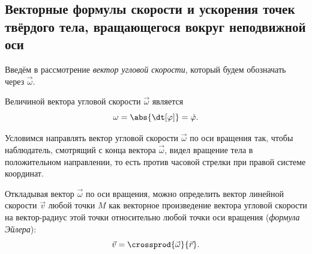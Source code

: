 
\subsection{Векторные формулы скорости и ускорения точек твёрдого тела,
вращающегося вокруг неподвижной оси}

Введём в рассмотрение \textit{вектор угловой скорости}, который будем обозначать
через $\vec{\omega}$.

Величиной вектора угловой скорости $\vec{\omega}$ является
\begin{equation*}
  \omega = \abs{\dt[\varphi]} = \dot{\varphi}.
\end{equation*}

Условимся направлять вектор угловой скорости $\vec{\omega}$ по оси вращения так,
чтобы наблюдатель, смотрящий с конца вектора $\vec{\omega}$, видел вращение тела
в положительном направлении, то есть против часовой стрелки при правой системе
координат.

Откладывая вектор $\vec{\omega}$ по оси вращения, можно определить вектор
линейной скорости $\vec{v}$ любой точки $M$ как векторное произведение вектора
угловой скорости на вектор-радиус этой точки относительно любой точки оси
вращения (\textit{формула Эйлера}):
\begin{equation}
  \label{eq:euler_formula}
  \vec{v} = \crossprod{\vec{\omega}}{\vec{r}}.
\end{equation}

